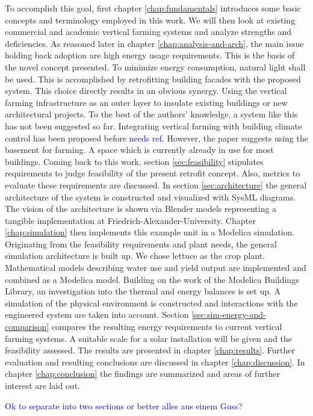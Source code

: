 To accomplish this goal, first chapter \ref{chap:fundamentals} introduces some basic concepts and terminology employed in this work.
We will then look at existing commercial and academic vertical farming systems and analyze strengths and deficiencies.
As reasoned later in chapter \ref{chap:analysis-and-arch}, the main issue holding back adoption are high energy usage requirements.
This is the basis of the novel concept presented.
To minimize energy consumption, natural light shall be used.
This is accomplished by retrofitting building facades with the proposed system.
This choice directly results in an obvious synergy.
Using the vertical farming infrastructure as an outer layer to insulate existing buildings or new architectural projects.
To the best of the authors' knowledge, a system like this has not been suggested so far.
Integrating vertical farming with building climate control has been proposed before \textcolor{Blue}{needs ref}.
However, the paper suggests using the basement for farming.
A space which is currently already in use for most buildings.
Coming back to this work, section \ref{sec:feasibility} stipulates requirements to judge feasibility of the present retrofit concept.
Also, metrics to evaluate these requirements are discussed.
In section \ref{sec:architecture} the general architecture of the system is constructed and visualized with SysML diagrams.
The vision of the architecture is shown via Blender models representing a tangible implementation at Friedrich-Alexander-University.
Chapter \ref{chap:simulation} then implements this example unit in a Modelica simulation.
Originating from the feasibility requirements and plant needs, the general simulation architecture is built up.
We chose lettuce as the crop plant.
Mathematical models describing water use and yield output are implemented and combined as a Modelica model.
Building on the work of the Modelica Buildings Library, an investigation into the thermal and energy balances is set up.
A simulation of the physical environment is constructed and interactions with the engineered system are taken into account.
Section \ref{sec:sim-energy-and-comparison} compares the resulting energy requirements to current vertical farming systems.
A suitable scale for a solar installation will be given and the feasibility assessed.
The results are presented in chapter \ref{chap:results}.
Further evaluation and resulting conclusions are discussed in chapter \ref{chap:discussion}.
In chapter \ref{chap:conclusion} the findings are summarized and areas of further interest are laid out.



\textcolor{Blue}{Ok to separate into two sections or better alles aus einem Guss?}
